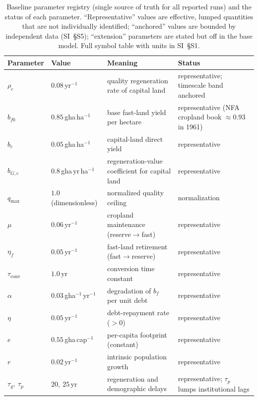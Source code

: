 \documentclass[preprint,12pt,authoryear]{elsarticle}
\newcommand{\tconv}{\tau_{\mathrm{conv}}}
\begin{document}
\begin{table}[!htbp]
\centering\footnotesize
\caption{Baseline parameter registry (single source of truth for all reported runs) and the status of each parameter. ``Representative'' values are effective, lumped quantities that are not individually identified; ``anchored'' values are bounded by independent data (SI~\S S5); ``extension'' parameters are stated but off in the base model. Full symbol table with units in SI~\S S1.}
\label{tab:params}
\setlength{\tabcolsep}{4pt}
\begin{tabularx}{\textwidth}{@{}>{\raggedright\arraybackslash}p{} >{\raggedright\arraybackslash}p{} >{\raggedright\arraybackslash}X >{\raggedright\arraybackslash}p{}@{}}
\toprule
Parameter & Value & Meaning & Status \\
\midrule
$\rho_c$ & $0.08$\,yr$^{-1}$ & quality regeneration rate of capital land & representative; timescale band anchored \\
$b_{f0}$ & $0.85$\,gha\,ha$^{-1}$ & base fast-land yield per hectare & representative (NFA cropland book $\approx0.93$ in 1961) \\
$b_c$ & $0.05$\,gha\,ha$^{-1}$ & capital-land direct yield & representative \\
$b_{G,c}$ & $0.8$\,gha\,yr\,ha$^{-1}$ & regeneration-value coefficient for capital land & representative \\
$q_{\max}$ & $1.0$ (dimensionless) & normalized quality ceiling & normalization \\
$\mu$ & $0.06$\,yr$^{-1}$ & cropland maintenance (reserve$\to$fast) & representative \\
$\eta_f$ & $0.05$\,yr$^{-1}$ & fast-land retirement (fast$\to$reserve) & representative \\
$\tconv$ & $1.0$\,yr & conversion time constant & representative \\
$\alpha$ & $0.03$\,gha$^{-1}$\,yr$^{-1}$ & degradation of $b_f$ per unit debt & representative \\
$\eta$ & $0.05$\,yr$^{-1}$ & debt-repayment rate ($>0$) & representative \\
$e$ & $0.55$\,gha\,cap$^{-1}$ & per-capita footprint (constant) & representative \\
$r$ & $0.02$\,yr$^{-1}$ & intrinsic population growth & representative \\
$\tau_g,\ \tau_p$ & $20,\ 25$\,yr & regeneration and demographic delays & representative; $\tau_p$ lumps institutional lags \\

\end{tabularx}
\end{table}
\end{document}
